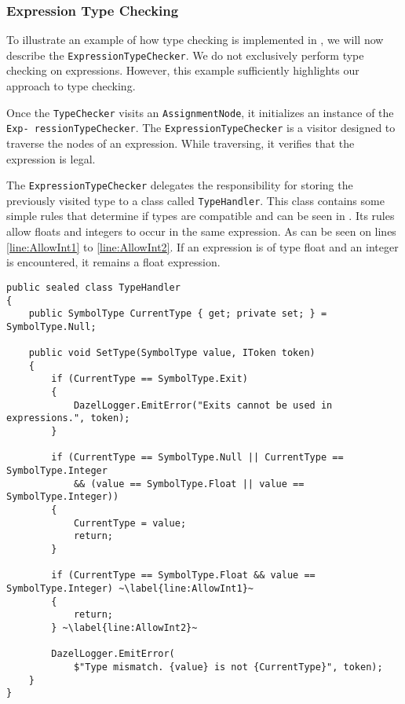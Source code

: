 \subsubsection*{Expression Type Checking} \label{sec:ExpressionTypeChecking}
To illustrate an example of how type checking is implemented in \dazel{}, we will now describe the \texttt{ExpressionTypeChecker}.
We do not exclusively perform type checking on expressions. However, this example sufficiently highlights our approach to type checking.


Once the \texttt{TypeChecker} visits an \texttt{AssignmentNode}, it initializes an instance of the \texttt{Exp-
ressionTypeChecker}. The \texttt{ExpressionTypeChecker} is a visitor designed to traverse the nodes of an expression. While traversing, it verifies that the expression is legal.

The \texttt{ExpressionTypeChecker} delegates the responsibility for storing the previously visited type to a class called \texttt{TypeHandler}. This class contains some simple rules that determine if types are compatible and can be seen in . 
Its rules allow floats and integers to occur in the same expression. As can be seen on lines \ref{line:AllowInt1} to \ref{line:AllowInt2}. If an expression is of type float and an integer is encountered, it remains a float expression.

\begin{lstlisting}[language=CSharp, caption={The \texttt{TypeHandler} class.}, label={lst:TypeHandler},escapechar=~]
public sealed class TypeHandler
{
    public SymbolType CurrentType { get; private set; } = SymbolType.Null;

    public void SetType(SymbolType value, IToken token)
    {
        if (CurrentType == SymbolType.Exit)
        {
            DazelLogger.EmitError("Exits cannot be used in expressions.", token);
        }
            
        if (CurrentType == SymbolType.Null || CurrentType == SymbolType.Integer 
            && (value == SymbolType.Float || value == SymbolType.Integer))
        {
            CurrentType = value;
            return;
        }
            
        if (CurrentType == SymbolType.Float && value == SymbolType.Integer) ~\label{line:AllowInt1}~
        {
            return;
        } ~\label{line:AllowInt2}~
            
        DazelLogger.EmitError(
            $"Type mismatch. {value} is not {CurrentType}", token);
    }
}
\end{lstlisting}

